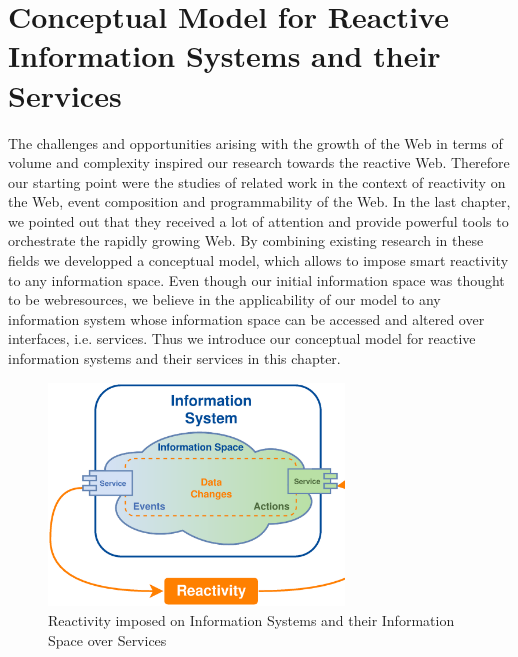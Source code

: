 
\chapter{Conceptual Model for Reactive Information Systems and their Services}

%


The challenges and opportunities arising with the growth of the Web in terms of volume and complexity inspired our research towards the reactive Web.
Therefore our starting point were the studies of related work in the context of reactivity on the Web, event composition and programmability of the Web.
In the last chapter, we pointed out that they received a lot of attention and provide powerful tools to orchestrate the rapidly growing Web.
By combining existing research in these fields we developped a conceptual model, which allows to impose smart reactivity to any information space.
Even though our initial information space was thought to be \textrm{\glspl{webresource}}, we believe in the applicability of our model to any information system whose information space can be accessed and altered over interfaces, i.e. services.
Thus we introduce our conceptual model for reactive information systems and their services in this chapter.
\begin{figure}[!ht]
  \centering
  \includegraphics[width=0.7\textwidth]{figures/IS_InformationSpace}
  \caption{Reactivity imposed on Information Systems and their Information Space over Services}
  \label{fig:IS_InformationSpace}
\end{figure}

